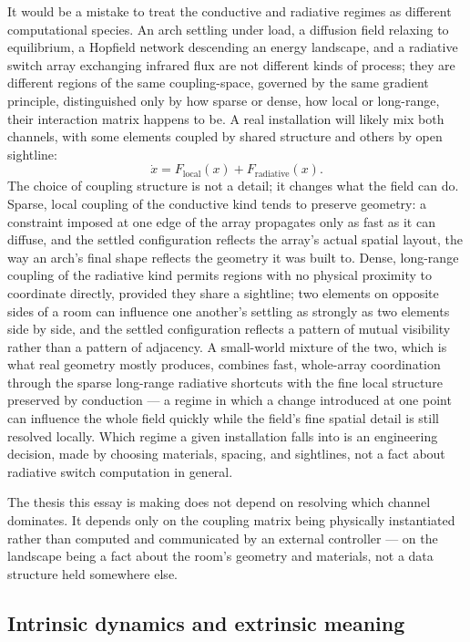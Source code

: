 \documentclass[11pt]{article}
\begin{document}
It would be a mistake to treat the conductive and radiative regimes as different computational species. An arch settling under load, a diffusion field relaxing to equilibrium, a Hopfield network descending an energy landscape, and a radiative switch array exchanging infrared flux are not different kinds of process; they are different regions of the same coupling-space, governed by the same gradient principle, distinguished only by how sparse or dense, how local or long-range, their interaction matrix happens to be. A real installation will likely mix both channels, with some elements coupled by shared structure and others by open sightline:
\[
\dot{x} = F_{\text{local}}(x) + F_{\text{radiative}}(x).
\]
The choice of coupling structure is not a detail; it changes what the field can do. Sparse, local coupling of the conductive kind tends to preserve geometry: a constraint imposed at one edge of the array propagates only as fast as it can diffuse, and the settled configuration reflects the array's actual spatial layout, the way an arch's final shape reflects the geometry it was built to. Dense, long-range coupling of the radiative kind permits regions with no physical proximity to coordinate directly, provided they share a sightline; two elements on opposite sides of a room can influence one another's settling as strongly as two elements side by side, and the settled configuration reflects a pattern of mutual visibility rather than a pattern of adjacency. A small-world mixture of the two, which is what real geometry mostly produces, combines fast, whole-array coordination through the sparse long-range radiative shortcuts with the fine local structure preserved by conduction --- a regime in which a change introduced at one point can influence the whole field quickly while the field's fine spatial detail is still resolved locally. Which regime a given installation falls into is an engineering decision, made by choosing materials, spacing, and sightlines, not a fact about radiative switch computation in general.

The thesis this essay is making does not depend on resolving which channel dominates. It depends only on the coupling matrix being physically instantiated rather than computed and communicated by an external controller --- on the landscape being a fact about the room's geometry and materials, not a data structure held somewhere else.

\subsection{Intrinsic dynamics and extrinsic meaning}
\end{document}
